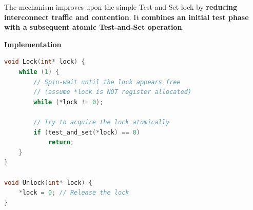 
The  mechanism improves upon the simple Test-and-Set lock by \textbf{reducing interconnect traffic and contention}. It \textbf{combines an initial test phase with a subsequent atomic Test-and-Set operation}.

\highspace
\begin{flushleft}
    \textcolor{Green3}{ \textbf{Implementation}}
\end{flushleft}
\begin{lstlisting}[language=C]
void Lock(int* lock) {
    while (1) {
        // Spin-wait until the lock appears free
        // (assume *lock is NOT register allocated)
        while (*lock != 0);

        // Try to acquire the lock atomically
        if (test_and_set(*lock) == 0)
            return;
    }
}

void Unlock(int* lock) {
    *lock = 0; // Release the lock
}    
\end{lstlisting}
